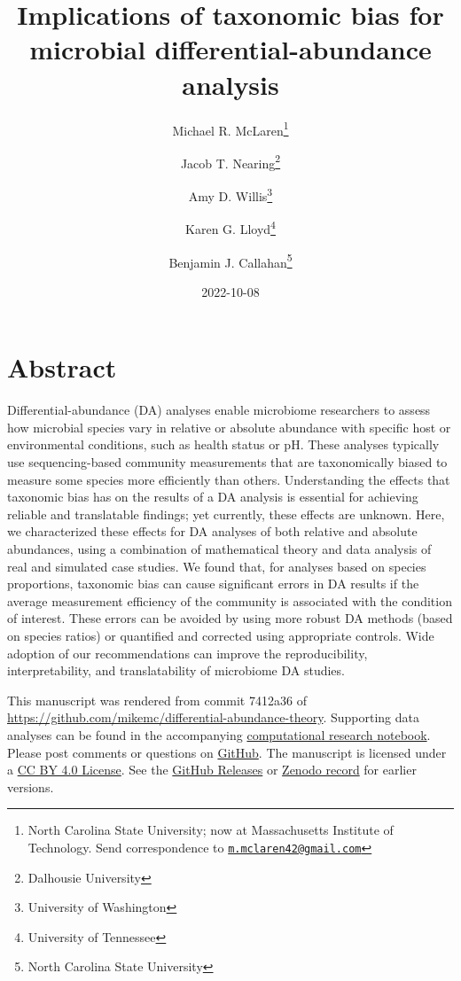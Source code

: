 \documentclass[
]{article}
\title{Implications of taxonomic bias for microbial differential-abundance analysis}
\author{Michael R. McLaren\footnote{North Carolina State University; now at Massachusetts Institute of Technology. Send correspondence to \href{mailto:m.mclaren42@gmail.com}{\nolinkurl{m.mclaren42@gmail.com}}} \and Jacob T. Nearing\footnote{Dalhousie University} \and Amy D. Willis\footnote{University of Washington} \and Karen G. Lloyd\footnote{University of Tennessee} \and Benjamin J. Callahan\footnote{North Carolina State University}}
\date{2022-10-08}
\begin{document}
\maketitle

{
\setcounter{tocdepth}{2}
\tableofcontents
}
\hypertarget{abstract}{%
\section*{Abstract}\label{abstract}}

Differential-abundance (DA) analyses enable microbiome researchers to assess how microbial species vary in relative or absolute abundance with specific host or environmental conditions, such as health status or pH.
These analyses typically use sequencing-based community measurements that are taxonomically biased to measure some species more efficiently than others.
Understanding the effects that taxonomic bias has on the results of a DA analysis is essential for achieving reliable and translatable findings; yet currently, these effects are unknown.
Here, we characterized these effects for DA analyses of both relative and absolute abundances, using a combination of mathematical theory and data analysis of real and simulated case studies.
We found that, for analyses based on species proportions, taxonomic bias can cause significant errors in DA results if the average measurement efficiency of the community is associated with the condition of interest.
These errors can be avoided by using more robust DA methods (based on species ratios) or quantified and corrected using appropriate controls.
Wide adoption of our recommendations can improve the reproducibility, interpretability, and translatability of microbiome DA studies.

\leavevmode{}%
This manuscript was rendered from commit 7412a36 of \url{https://github.com/mikemc/differential-abundance-theory}.
Supporting data analyses can be found in the accompanying \href{https://mikemc.github.io/differential-abundance-theory/notebook/}{computational research notebook}.
Please post comments or questions on \href{https://github.com/mikemc/differential-abundance-theory}{GitHub}.
The manuscript is licensed under a \href{https://creativecommons.org/licenses/by/4.0/}{CC BY 4.0 License}.
See the \href{https://github.com/mikemc/differential-abundance-theory/releases}{GitHub Releases} or \href{https://doi.org/10.5281/zenodo.4552717}{Zenodo record} for earlier versions.
\end{document}
